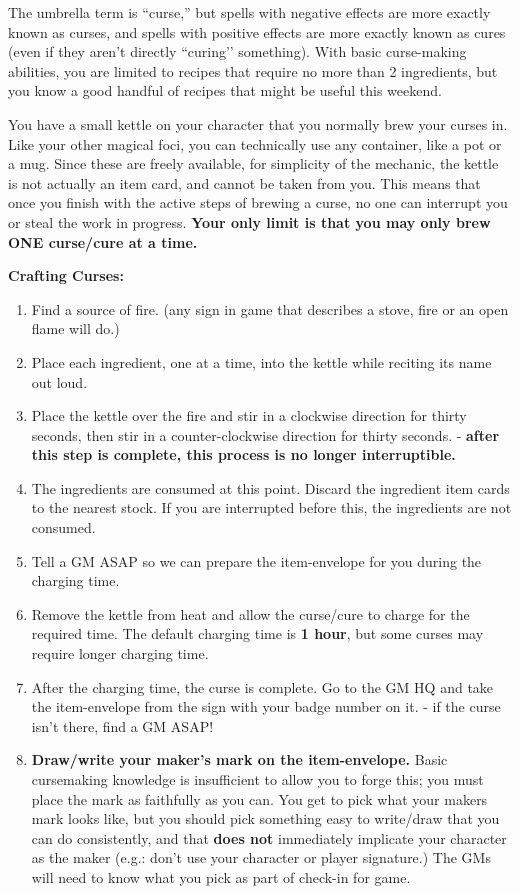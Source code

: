 \documentclass[green]{GL2020}
\begin{document}
\name{\gCursemakingBasic{}}

The umbrella term is ``curse,'' but spells with negative effects are more exactly known as curses, and spells with positive effects are more exactly known as cures (even if they aren’t directly ``curing’’ something). With basic curse-making abilities, you are limited to recipes that require no more than 2 ingredients, but you know a good handful of recipes that might be useful this weekend.

You have a small kettle on your character that you normally brew your curses in. Like your other magical foci, you can technically use any container, like a pot or a mug. Since these are freely available, for simplicity of the mechanic, the kettle is not actually an item card, and cannot be taken from you. This means that once you finish with the active steps of brewing a curse, no one can interrupt you or steal the work in progress. \textbf{Your only limit is that you may only brew ONE curse/cure at a time.}

\textbf{Crafting Curses:}
\begin{enumerate}
	\item Find a source of fire. (any sign in game that describes a stove, fire or an open flame will do.)
	\item Place each ingredient, one at a time, into the kettle while reciting its name out loud. 
	\item Place the kettle over the fire and stir in a clockwise direction for thirty seconds, then stir in a counter-clockwise direction for thirty seconds. -\textbf{ after this step is complete, this process is no longer interruptible.}
	\item The ingredients are consumed at this point. Discard the ingredient item cards to the nearest stock. If you are interrupted before this, the ingredients are not consumed.
	\item Tell a GM ASAP so we can prepare the item-envelope for you during the charging time.
	\item Remove the kettle from heat and allow the curse/cure to charge for the required time. The default charging time is \textbf{1 hour}, but some curses may require longer charging time.
	\item After the charging time, the curse is complete. Go to the GM HQ and take the item-envelope from the sign with your badge number on it. - if the curse isn’t there, find a GM ASAP!
	\item \textbf{Draw/write your maker's mark on the item-envelope.} Basic cursemaking knowledge is insufficient to allow you to forge this; you must place the mark as faithfully as you can. You get to pick what your makers mark looks like, but you should pick something easy to write/draw that you can do consistently, and that \textbf{does not} immediately implicate your character as the maker (e.g.: don’t use your character or player signature.) The GMs will need to know what you pick as part of check-in for game.
\end{enumerate}
\end{document}
